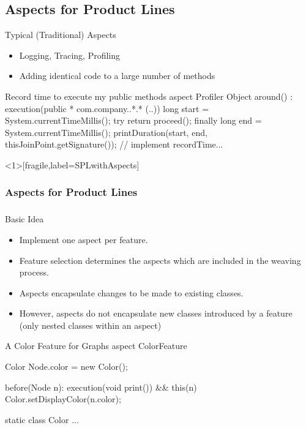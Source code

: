 \subsection{Aspects for Product Lines}

\begin{frame}[fragile]{Typical (Traditional) Aspects}
	\begin{itemize}
		\item Logging, Tracing, Profiling
		\item Adding identical code to a large number of methods
	\end{itemize}
\begin{codetight}{Record time to execute my public methods}
aspect Profiler {   
    Object around() : execution(public * com.company..*.* (..)) {
        long start = System.currentTimeMillis();
        try {
            return proceed();
        } finally {
            long end = System.currentTimeMillis();
            printDuration(start, end, 
                thisJoinPoint.getSignature());
        }
    }
    // implement recordTime...
}
\end{codetight}	
\end{frame}

\begin{frame}<1>[fragile,label=SPLwithAspects]
	\frametitle<1>{Aspects for Product Lines}
	\frametitle<2>{\myframetitle}
	\begin{mycolumns}[widths={45},animation=none]
		\begin{definition}{Basic Idea}
			\begin{itemize}
				\item Implement one aspect per feature.
				\item Feature selection determines the aspects which are included in the weaving process.
			\end{itemize}
		\end{definition}
		\begin{note}{}
			\begin{itemize}
				\item Aspects encapsulate changes to be made to existing classes. 
				\item However, aspects do not encapsulate new classes introduced by a feature (only nested classes within an aspect)%
			\end{itemize}
		\end{note}
	\mynextcolumn
\begin{codetight}{A Color Feature for Graphs}
aspect ColorFeature {
	Color Node.color = new Color();
	
	before(Node n): execution(void print()) && this(n) {
		Color.setDisplayColor(n.color);
	}
	
	static class Color {
		...
	}
}
\end{codetight}	
	\end{mycolumns}
\end{frame}

